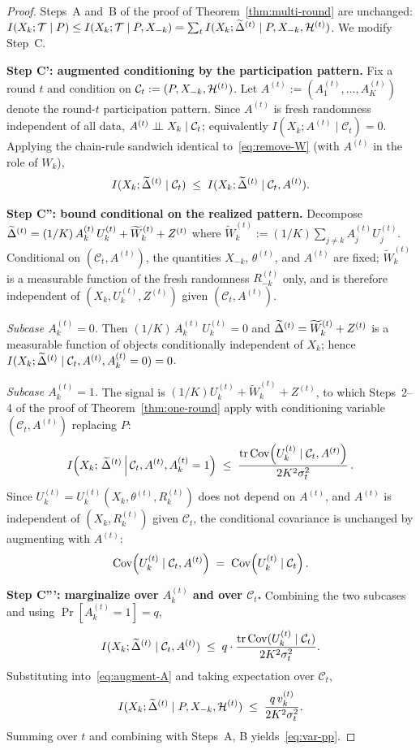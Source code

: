 \begin{proof}
Steps~A and~B of the proof of Theorem~\ref{thm:multi-round} are unchanged: \(I(X_k;\mathcal{T}\mid P)\le I(X_k;\mathcal{T}\mid P,X_{-k})=\sum_t I(X_k;\widetilde{\Delta}^{(t)}\mid P,X_{-k},\mathcal{H}^{(t)})\). We modify Step~C.

\textbf{Step C': augmented conditioning by the participation pattern.}
Fix a round \(t\) and condition on \(\mathcal C_t:=(P,X_{-k},\mathcal{H}^{(t)})\). Let \(A^{(t)}:=(A_1^{(t)},\dots,A_K^{(t)})\) denote the round-\(t\) participation pattern. Since \(A^{(t)}\) is fresh randomness independent of all data, \(A^{(t)}\perp\!\!\!\perp X_k\mid\mathcal C_t\); equivalently \(I(X_k;A^{(t)}\mid\mathcal C_t)=0\). Applying the chain-rule sandwich identical to~\eqref{eq:remove-W} (with \(A^{(t)}\) in the role of \(W_k\)),
\begin{equation}\label{eq:augment-A}
I(X_k;\widetilde{\Delta}^{(t)}\mid\mathcal C_t)\;\le\;I(X_k;\widetilde{\Delta}^{(t)}\mid\mathcal C_t,A^{(t)}).
\end{equation}

\textbf{Step C'': bound conditional on the realized pattern.}
Decompose \(\widetilde{\Delta}^{(t)}=(1/K)\,A_k^{(t)}\,U_k^{(t)}+\widetilde W_k^{(t)}+Z^{(t)}\) where \(\widetilde W_k^{(t)}:=(1/K)\sum_{j\ne k}A_j^{(t)}U_j^{(t)}\). Conditional on \((\mathcal C_t,A^{(t)})\), the quantities \(X_{-k}\), \(\theta^{(t)}\), and \(A^{(t)}\) are fixed; \(\widetilde W_k^{(t)}\) is a measurable function of the fresh randomness \(R_{-k}^{(t)}\) only, and is therefore independent of \((X_k,U_k^{(t)},Z^{(t)})\) given \((\mathcal C_t,A^{(t)})\).

\emph{Subcase \(A_k^{(t)}=0\).} Then \((1/K)\,A_k^{(t)}\,U_k^{(t)}=0\) and \(\widetilde{\Delta}^{(t)}=\widetilde W_k^{(t)}+Z^{(t)}\) is a measurable function of objects conditionally independent of \(X_k\); hence
\(I(X_k;\widetilde{\Delta}^{(t)}\mid\mathcal C_t,A^{(t)},A_k^{(t)}=0)=0\).

\emph{Subcase \(A_k^{(t)}=1\).} The signal is \((1/K)U_k^{(t)}+\widetilde W_k^{(t)}+Z^{(t)}\), to which Steps~2--4 of the proof of Theorem~\ref{thm:one-round} apply with conditioning variable \((\mathcal C_t,A^{(t)})\) replacing \(P\):
\[
I\!\left(X_k;\,\widetilde{\Delta}^{(t)}\,\middle|\,\mathcal C_t,A^{(t)},A_k^{(t)}=1\right)\;\le\;\frac{\operatorname{tr}\operatorname{Cov}\!\left(U_k^{(t)}\mid\mathcal C_t,A^{(t)}\right)}{2K^2\sigma_t^2}\,.
\]
Since \(U_k^{(t)}=U_k^{(t)}(X_k,\theta^{(t)},R_k^{(t)})\) does not depend on \(A^{(t)}\), and \(A^{(t)}\) is independent of \((X_k,R_k^{(t)})\) given \(\mathcal C_t\), the conditional covariance is unchanged by augmenting with \(A^{(t)}\):
\[
\operatorname{Cov}\!\left(U_k^{(t)}\mid\mathcal C_t,A^{(t)}\right)\;=\;\operatorname{Cov}\!\left(U_k^{(t)}\mid\mathcal C_t\right).
\]

\textbf{Step C''': marginalize over \(A_k^{(t)}\) and over \(\mathcal C_t\).}
Combining the two subcases and using \(\Pr[A_k^{(t)}=1]=q\),
\[
I(X_k;\widetilde{\Delta}^{(t)}\mid\mathcal C_t,A^{(t)})\;\le\;q\cdot\frac{\operatorname{tr}\operatorname{Cov}(U_k^{(t)}\mid\mathcal C_t)}{2K^2\sigma_t^2}.
\]
Substituting into~\eqref{eq:augment-A} and taking expectation over \(\mathcal C_t\),
\[
I(X_k;\widetilde{\Delta}^{(t)}\mid P,X_{-k},\mathcal{H}^{(t)})\;\le\;\frac{q\,v_k^{(t)}}{2K^2\sigma_t^2}.
\]
Summing over \(t\) and combining with Steps~A, B yields~\eqref{eq:var-pp}.
\end{proof}

